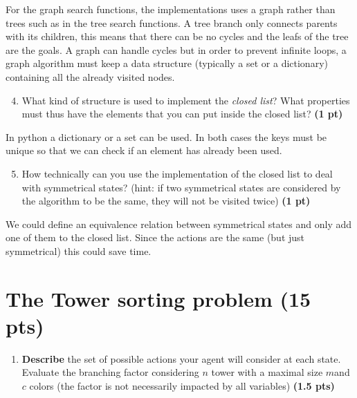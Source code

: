 \documentclass[11pt,a4paper]{report}
\begin{document}
\begin{answer}
For the graph search functions, the implementations uses a graph rather than trees such as in the tree search functions.
A tree branch only connects parents with its children, this means that there can be no cycles and the leafs of the tree are the goals.
A graph can handle cycles but in order to prevent infinite loops, a graph algorithm must keep a data structure (typically a set or a dictionary) containing all the already visited nodes.
\end{answer}



\begin{enumerate}
\setcounter{enumi}{3}
    \item What kind of structure is used to implement the \textit{closed list}? 
    What properties must thus have the elements that you can
    put inside the closed list? \textbf{(1 pt)}
\end{enumerate}

\begin{answer}
In python a dictionary or a set can be used. In both cases the keys must be unique so that we can check if an element has already been used.
\end{answer}



\begin{enumerate}
\setcounter{enumi}{4}
    \item How technically can you use the implementation of the closed list to deal with symmetrical states? (hint: if two symmetrical states are considered by the algorithm to be the same, they will not be visited twice) \textbf{(1 pt)}
\end{enumerate}

\begin{answer}
We could define an equivalence relation between symmetrical states and only add one of them to the closed list.
Since the actions are the same (but just symmetrical) this could save time.
\end{answer}




\section{The Tower sorting problem (15 pts)}

\begin{enumerate}
  \item \textbf{Describe} the set of possible actions your agent will consider at each state. 
  Evaluate the branching factor considering $n$ tower with a maximal size $m$and $c$ colors (the factor is not necessarily impacted by all variables) \textbf{(1.5 pts)}
\end{enumerate}
\end{document}
